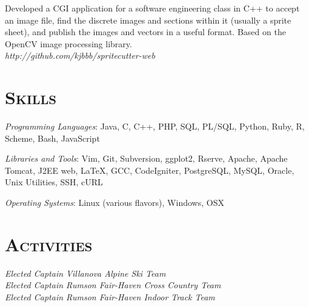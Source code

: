 \begin{resume}
\begin{position}
Developed a CGI application for a software engineering class in C++ to accept an
image file, find the discrete images and sections within it (usually a sprite
sheet), and publish the images and vectors in a useful format. Based on the
OpenCV image processing library. \\
{\itshape http://github.com/kjbbb/spritecutter-web}
\end{position}



\section{\textsc{Skills}}

\emph{Programming Languages}: Java, C, C++, PHP, SQL, PL/SQL, Python, Ruby, R,
Scheme, Bash, JavaScript

\emph{Libraries and Tools}: Vim, Git, Subversion, ggplot2, Rserve, Apache,
Apache Tomcat, J2EE web, LaTeX, GCC, CodeIgniter, PostgreSQL, MySQL,
Oracle, Unix Utilities, SSH, cURL

\emph{Operating Systems}: Linux (various flavors), Windows, OSX


\section{\textsc{Activities}}

\emph{Elected Captain Villanova Alpine Ski Team} \\
\emph{Elected Captain Rumson Fair-Haven Cross Country Team} \\
\emph{Elected Captain Rumson Fair-Haven Indoor Track Team} \\

\begin{formatb}
  \\
  \body\\
\end{formatb}



%


\end{resume}

